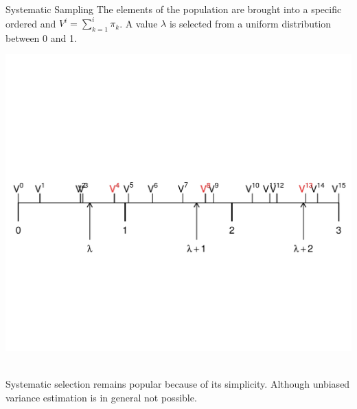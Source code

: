 \documentclass{beamer}\usepackage[]{graphicx}\usepackage[]{color}
\newenvironment{knitrout}{}{} %
\begin{document}
\begin{frame}{Systematic Sampling}
The elements of the population are brought into a specific ordered and $V^i = \sum_{k=1}^i \pi_k$. A value $\lambda$ is selected from a uniform distribution between 0 and 1.
~\\[-3cm]
\begin{knitrout}
\color{fgcolor}

{\centering \includegraphics[width=.95\linewidth]{figure/UP_SYS-1} 

}



\end{knitrout}
~\\[-3cm]
Systematic selection remains popular because of its simplicity. Although unbiased variance estimation is in general not possible.
\end{frame}
\end{document}
